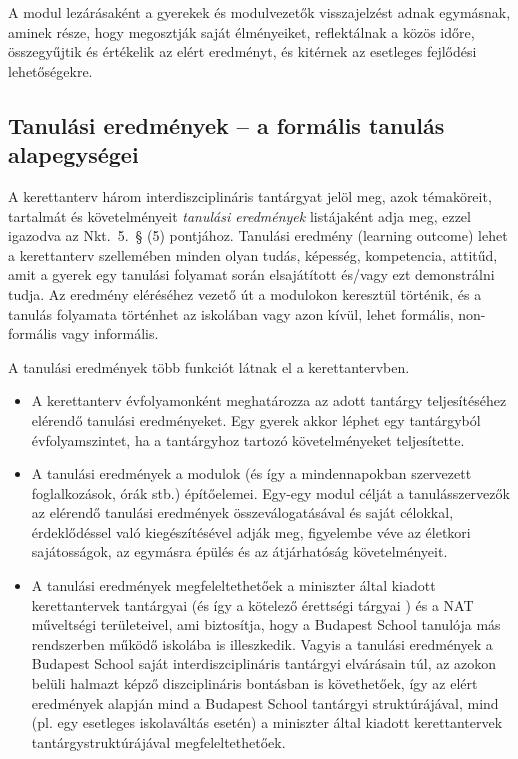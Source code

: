 A modul lezárásaként a gyerekek és modulvezetők visszajelzést adnak
egymásnak, aminek része, hogy megosztják saját élményeiket, reflektálnak
a közös időre, összegyűjtik és értékelik az elért eredményt, és kitérnek
az esetleges fejlődési lehetőségekre.

\subsection{Tanulási eredmények -- a formális tanulás alapegységei}
\label{sec:tanulasi_eredmenyek}
A kerettanterv három interdiszciplináris tantárgyat jelöl meg, azok
témaköreit, tartalmát és követelményeit \emph{tanulási eredmények}
listájaként adja meg, ezzel igazodva az Nkt.~5.~§ (5) pontjához. Tanulási
eredmény (learning outcome) lehet a kerettanterv szellemében minden
olyan tudás, képesség, kompetencia, attitűd, amit a gyerek egy tanulási
folyamat során elsajátított és/vagy ezt demonstrálni tudja. Az eredmény
eléréséhez vezető út a modulokon keresztül történik, és a tanulás
folyamata történhet az iskolában vagy azon kívül, lehet formális,
non-formális vagy informális.

A tanulási eredmények több funkciót látnak el a kerettantervben.

\begin{itemize}

      \item A kerettanterv évfolyamonként meghatározza az adott tantárgy
            teljesítéséhez elérendő tanulási eredményeket. Egy gyerek akkor 
            léphet
            egy tantárgyból évfolyamszintet, ha a tantárgyhoz tartozó
            követelményeket teljesítette.

      \item A tanulási eredmények a modulok (és így a mindennapokban szervezett
            foglalkozások, órák stb.) építőelemei. Egy-egy modul
            célját a  tanulásszervezők az elérendő tanulási
            eredmények	összeválogatásával és saját célokkal,
            érdeklődéssel való	kiegészítésével adják meg,
            figyelembe véve az életkori  sajátosságok, az egymásra
            épülés és az átjárhatóság  követelményeit.
      \item A tanulási eredmények megfeleltethetőek a miniszter által kiadott
            kerettantervek tantárgyai (és így a kötelező érettségi
            tárgyai )  és a NAT műveltségi területeivel, ami
            biztosítja, hogy a Budapest  School tanulója más
            rendszerben működő iskolába is illeszkedik.  Vagyis a
            tanulási eredmények a Budapest School saját
            interdiszciplináris tantárgyi elvárásain túl, az azokon belüli
            halmazt képző diszciplináris bontásban is követhetőek,
            így az	elért eredmények alapján mind a Budapest School
            tantárgyi  struktúrájával, mind (pl. egy esetleges
            iskolaváltás esetén) a	miniszter által kiadott
            kerettantervek tantárgystruktúrájával
            megfeleltethetőek.
\end{itemize}

